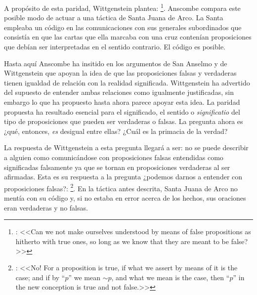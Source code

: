 A propósito de esta paridad, Wittgenstein plantea: \footnote{\cite[\S4.062]{wittgenstein1922tractatus}:
  <<Can we not make ourselves understood by means of false propositions as
  hitherto with true ones, so long as we know that they are meant to be
  false?>>}. Anscombe compara este posible modo de actuar a una táctica de Santa
Juana de Arco. La Santa empleaba un código en las comunicaciones con sus
generales subordinados que consistía en que las cartas que ella marcaba con una
cruz contenían proposiciones que debían ser interpretadas en el sentido
contrario\autocite[Cf.~][73]{anscombe2011plato:truth}. El código es posible.

Hasta aquí Anscombe ha insitido en los argumentos de San Anselmo y de
Wittgenstein que apoyan la idea de que las proposiciones falsas y verdaderas
tienen igualdad de relación con la realidad significada. Wittgenstein ha
advertido del supuesto de entender ambas relaciones como igualmente
justificadas, sin embargo lo que ha propuesto hasta ahora parece apoyar esta
idea. La paridad propuesta ha resultado esencial para el significado, el sentido
o \emph{significatio} del tipo de proposiciones que pueden ser verdaderas o
falsas. La pregunta ahora es ¿qué, entonces, \emph{es} desigual entre ellas?
¿Cuál es la primacia de la verdad?

La respuesta de Wittgenstein a esta pregunta llegará a ser: no se puede
describir a alguien como comunicándose con proposiciones falsas entendidas como
significadas falsamente ya que se tornan en proposiciones verdaderas al ser
afirmadas\autocite[Cf.~][75]{anscombe2011plato:truth}. Esta es su respuesta a la
pregunta ¿podemos darnos a entender con proposiciones falsas?:
\footnote{\cite[\S4.062]{wittgenstein1922tractatus}: <<No! For a
  proposition is true, if what we assert by means of it is the case; and if by
  ``$p$'' we mean ${\sim}p$, and what we mean is the case, then ``$p$'' in the
  new conception is true and not false.>>}. En la táctica antes descrita, Santa
Juana de Arco no mentía con su código y, si no estaba en error acerca de los
hechos, sus oraciones eran verdaderas y no
falsas\autocite[Cf.~][75]{anscombe2011plato:truth}.

